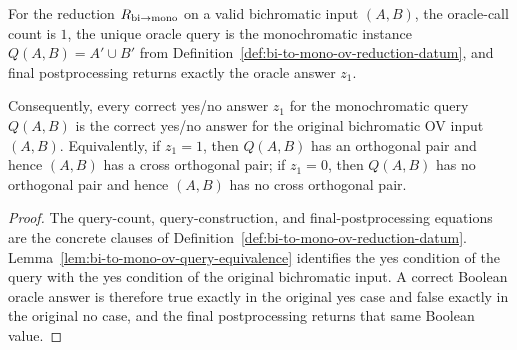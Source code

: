\begin{lemma}
  \label{lem:bi-to-mono-ov-oracle-answer-transfer}
  For the reduction $R_{\rm bi\to mono}$ on a valid bichromatic input
  $(A,B)$, the oracle-call count is $1$, the unique oracle query is the
  monochromatic instance $Q(A,B)=A'\cup B'$ from
  Definition~\ref{def:bi-to-mono-ov-reduction-datum}, and final
  postprocessing returns exactly the oracle answer $z_1$.

  Consequently, every correct yes/no answer $z_1$ for the monochromatic query
  $Q(A,B)$ is the correct yes/no answer for the original bichromatic OV input
  $(A,B)$.  Equivalently, if $z_1=1$, then
  $Q(A,B)$ has an orthogonal pair and hence $(A,B)$ has a cross orthogonal
  pair; if $z_1=0$, then $Q(A,B)$ has no orthogonal pair and hence $(A,B)$ has
  no cross orthogonal pair.
\end{lemma}
\begin{proof}
  The query-count, query-construction, and final-postprocessing equations are
  the concrete clauses of Definition~\ref{def:bi-to-mono-ov-reduction-datum}.
  Lemma~\ref{lem:bi-to-mono-ov-query-equivalence} identifies the yes condition
  of the query with the yes condition of the original bichromatic input.  A
  correct Boolean oracle answer is therefore true exactly in the original yes
  case and false exactly in the original no case, and the final
  postprocessing returns that same Boolean value.
\end{proof}

